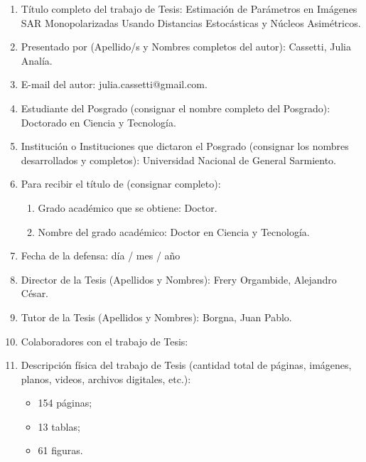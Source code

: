 \begin{enumerate}
	\item Título completo del trabajo de Tesis: Estimación de Parámetros en Imágenes SAR Monopolarizadas Usando Distancias Estocásticas y Núcleos Asimétricos.
	
	\item Presentado por (Apellido/s y Nombres completos del autor): Cassetti, Julia Analía.
	
	\item E-mail del autor: julia.cassetti@gmail.com.
	
	\item Estudiante del Posgrado (consignar el nombre completo del Posgrado): Doctorado en Ciencia y Tecnología.
	
	\item Institución o Instituciones que dictaron el Posgrado (consignar los nombres
	desarrollados y completos): Universidad Nacional de General Sarmiento.
	
	\item Para recibir el título de (consignar completo):
	
	\begin{enumerate}%
		\item Grado académico que se obtiene: Doctor.
		\item Nombre del grado académico: Doctor en Ciencia y Tecnología.
	\end{enumerate}
	
	\item Fecha de la defensa: día / mes / año %
	
	\item Director de la Tesis (Apellidos y Nombres): Frery Orgambide, Alejandro César.
	
	\item Tutor de la Tesis (Apellidos y Nombres): Borgna, Juan Pablo.
	
	\item Colaboradores con el trabajo de Tesis: 
	
	\item Descripción física del trabajo de Tesis (cantidad total de páginas, imágenes, planos, videos, archivos digitales, etc.):
	\begin{itemize}%
		\item 154 páginas;
		\item 13 tablas;
		\item 61 figuras.
	\end{itemize}
	

\end{enumerate}
